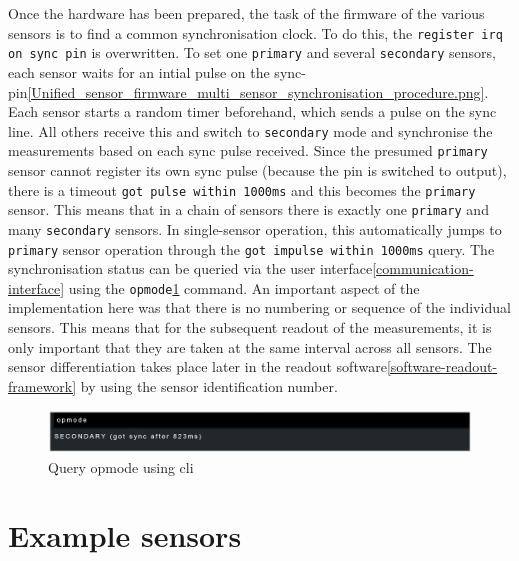 Once the hardware has been prepared, the task of the firmware of the
various sensors is to find a common synchronisation clock. To do this,
the \passthrough{\lstinline!register irq on sync pin!} is overwritten.
To set one \passthrough{\lstinline!primary!} and several
\passthrough{\lstinline!secondary!} sensors, each sensor waits for an
intial pulse on the
sync-pin\ref{Unified_sensor_firmware_multi_sensor_synchronisation_procedure.png}.
Each sensor starts a random timer beforehand, which sends a pulse on the
sync line. All others receive this and switch to
\passthrough{\lstinline!secondary!} mode and synchronise the
measurements based on each sync pulse received. Since the presumed
\passthrough{\lstinline!primary!} sensor cannot register its own sync
pulse (because the pin is switched to output), there is a timeout
\passthrough{\lstinline!got pulse within 1000ms!} and this becomes the
\passthrough{\lstinline!primary!} sensor. This means that in a chain of
sensors there is exactly one \passthrough{\lstinline!primary!} and many
\passthrough{\lstinline!secondary!} sensors. In single-sensor operation,
this automatically jumps to \passthrough{\lstinline!primary!} sensor
operation through the
\passthrough{\lstinline!got impulse within 1000ms!} query. The
synchronisation status can be queried via the user
interface\ref{communication-interface} using the
\passthrough{\lstinline!opmode!}\ref{Query_opmode_using_(+cli).png}
command. An important aspect of the implementation here was that there
is no numbering or sequence of the individual sensors. This means that
for the subsequent readout of the measurements, it is only important
that they are taken at the same interval across all sensors. The sensor
differentiation takes place later in the readout
software\ref{software-readout-framework} by using the sensor
identification number.

\begin{figure}
\centering
\includegraphics{./generated_images/border_Query_opmode_using_(+cli).png}
\caption{Query opmode using \gls{cli}
\label{Query_opmode_using_(+cli).png}}
\end{figure}

\hypertarget{example-sensors}{%
\section{Example sensors}\label{example-sensors}}

